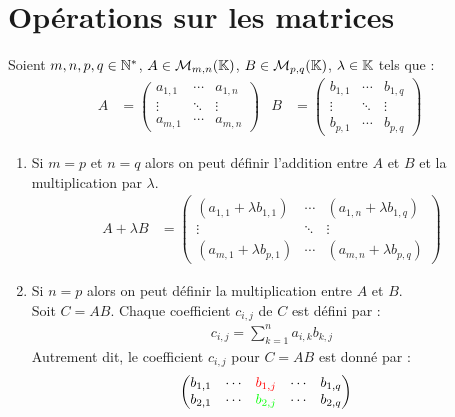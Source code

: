 \section{Opérations sur les matrices}
\begin{definition}
	Soient $m, n, p, q \in \mathbb{N}^*$, $A \in \mathcal{M}_{m, n}(\mathbb{K})$, $B \in \mathcal{M}_{p, q}(\mathbb{K})$, $\lambda  \in \mathbb{K}$ tels que :
	\begin{align*}
		A &=
		\begin{pmatrix}
			a_{1,1} & \cdots & a_{1,n} \\
			\vdots & \ddots & \vdots \\
			a_{m,1} & \cdots & a_{m,n}
		\end{pmatrix}
		&
		B &= 
		\begin{pmatrix}
			b_{1,1} & \cdots & b_{1,q} \\
			\vdots & \ddots & \vdots \\
			b_{p,1} & \cdots & b_{p,q}
		\end{pmatrix}
	\end{align*}
	\begin{enumerate}
		\item Si $m = p$ et $n = q$ alors on peut définir l'addition entre $A$ et $ B$ et la multiplication par $\lambda$.
		\begin{align*}
			A + \lambda B &= 
			\begin{pmatrix}
				(a_{1,1} + \lambda b_{1,1}) & \cdots & (a_{1,n} + \lambda b_{1,q}) \\
				\vdots & \ddots & \vdots \\
				(a_{m,1} + \lambda b_{p,1}) & \cdots & (a_{m,n} + \lambda b_{p,q})
			\end{pmatrix}
		\end{align*}
		\item Si $n = p$ alors on peut définir la multiplication entre $A$ et $B$.\\
		Soit $C = AB$. Chaque coefficient $c_{i,j}$ de $C$ est défini par :
		\begin{align*}
			c_{i,j} = \sum_{k=1}^{n} a_{i,k} b_{k,j}
		\end{align*}
        Autrement dit, le coefficient $c_{i,j}$ pour $C = AB$ est donné par :
        \begin{align*}
            &\begin{pmatrix}
                b_{1,1} & \cdots & \color{red}b_{1,j} & \cdots & b_{1,q} \\
                b_{2,1} & \cdots & \color{green}b_{2,j} & \cdots & b_{2,q} \\

\end{pmatrix}
\end{align*}
\end{enumerate}
\end{definition}
